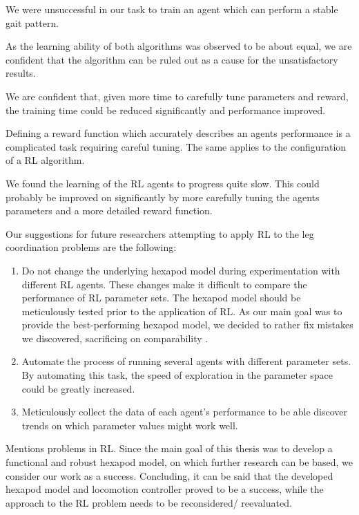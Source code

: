 We were unsuccessful in our task to train an agent which can perform a stable gait pattern.

As the learning ability of both algorithms was observed to be about equal, we are confident that the algorithm can be ruled out as a cause for the unsatisfactory results. 

We are confident that, given more time to carefully tune parameters and reward, the training time could be reduced significantly and performance improved.

Defining a reward function which accurately describes an agents performance is a complicated task requiring careful tuning.
The same applies to the configuration of a RL algorithm.

We found the learning of the RL agents to progress quite slow. 
This could probably be improved on significantly by more carefully tuning the agents parameters and a more detailed reward function.

Our suggestions for future researchers attempting to apply RL to the leg coordination problems are the following:
\begin{enumerate}
	\item Do not change the underlying hexapod model during experimentation with different RL agents. 
	These changes make it difficult to compare the performance of RL parameter sets.
	The hexapod model should be meticulously tested prior to the application of RL.
	As our main goal was to provide the best-performing hexapod model, we decided to rather fix mistakes we discovered, sacrificing on comparability .
	
	\item Automate the process of running several agents with different parameter sets. 
	By automating this task, the speed of exploration in the parameter space could be greatly increased.
	
	\item Meticulously collect the data of each agent's performance to be able discover trends on which parameter values might work well.
	
\end{enumerate}

Mentions problems in RL.
Since the main goal of this thesis was to develop a functional and robust hexapod model, on which further research can be based, we consider our work as a success.
Concluding, it can be said that the developed hexapod model and locomotion controller proved to be a success, while the approach to the RL problem needs to be reconsidered/ reevaluated.


